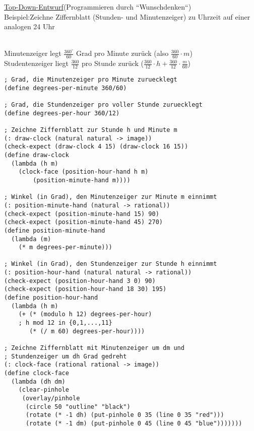 \underline{Top-Down-Entwurf}(Programmieren durch ``Wunschdenken``)\\
Beispiel:Zeichne Ziffernblatt (Stunden- und Minutenzeiger) zu Uhrzeit auf einer analogen 24 Uhr\\
\\
  Minutenzeiger legt $\frac{360^{\circ}}{60}$ Grad pro Minute zur\"uck (also $\frac{360}{60} \cdot m$)\\
  Studentenzeiger liegt $\frac{360}{12}$ pro Stunde zur\"uck
 ($\frac{360}{12} \cdot h +\frac{360}{12} \cdot \frac{m}{60}$)
\begin{lstlisting}[frame=single]
; Grad, die Minutenzeiger pro Minute zuruecklegt
(define degrees-per-minute 360/60)

; Grad, die Stundenzeiger pro voller Stunde zuruecklegt
(define degrees-per-hour 360/12)

; Zeichne Ziffernblatt zur Stunde h und Minute m
(: draw-clock (natural natural -> image))
(check-expect (draw-clock 4 15) (draw-clock 16 15))
(define draw-clock
  (lambda (h m)
    (clock-face (position-hour-hand h m)  
    	(position-minute-hand m))))

; Winkel (in Grad), den Minutenzeiger zur Minute m einnimmt
(: position-minute-hand (natural -> rational))
(check-expect (position-minute-hand 15) 90)
(check-expect (position-minute-hand 45) 270)
(define position-minute-hand
  (lambda (m)
    (* m degrees-per-minute)))

; Winkel (in Grad), den Stundenzeiger zur Stunde h einnimmt
(: position-hour-hand (natural natural -> rational))
(check-expect (position-hour-hand 3 0) 90)
(check-expect (position-hour-hand 18 30) 195)
(define position-hour-hand
  (lambda (h m)
    (+ (* (modulo h 12) degrees-per-hour)
    ; h mod 12 in {0,1,...,11}
       (* (/ m 60) degrees-per-hour))))

; Zeichne Ziffernblatt mit Minutenzeiger um dm und
; Stundenzeiger um dh Grad gedreht
(: clock-face (rational rational -> image))
(define clock-face
  (lambda (dh dm)
    (clear-pinhole
     (overlay/pinhole
      (circle 50 "outline" "black")
      (rotate (* -1 dh) (put-pinhole 0 35 (line 0 35 "red")))
      (rotate (* -1 dm) (put-pinhole 0 45 (line 0 45 "blue")))))))
\end{lstlisting}
